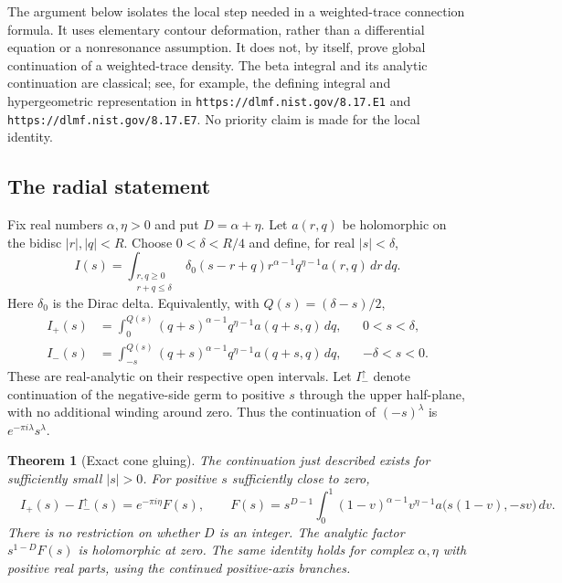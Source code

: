 \documentclass[11pt,a4paper]{article}
\newtheorem{theorem}{Theorem}[section]
\theoremstyle{definition}
\theoremstyle{remark}
\numberwithin{equation}{section}
\begin{document}
The argument below isolates the local step needed in a weighted-trace
connection formula. It uses elementary contour deformation, rather than
a differential equation or a nonresonance assumption. It does not, by
itself, prove global continuation of a weighted-trace density. The beta
integral and its analytic continuation are classical; see, for example,
the defining integral and hypergeometric representation in
\texttt{https://dlmf.nist.gov/8.17.E1} and
\texttt{https://dlmf.nist.gov/8.17.E7}. No priority claim is made for
the local identity.

\subsection{The radial statement}

Fix real numbers $\alpha,\eta>0$ and put $D=\alpha+\eta$.
Let $a(r,q)$ be holomorphic on the bidisc $|r|,|q|<R$.
Choose $0<\delta<R/4$ and define, for real $|s|<\delta$,
\begin{equation}\label{p9:acg:density}
 I(s)=\int_{\substack{r,q\geq0\\r+q\leq\delta}}
       \delta_0(s-r+q)r^{\alpha-1}q^{\eta-1}a(r,q)\,dr\,dq.
\end{equation}
Here $\delta_0$ is the Dirac delta. Equivalently, with
$Q(s)=(\delta-s)/2$,
\begin{align}
 I_+(s)&=\int_0^{Q(s)}(q+s)^{\alpha-1}q^{\eta-1}a(q+s,q)\,dq,
                    &&0<s<\delta,\label{p9:acg:right}\\
 I_-(s)&=\int_{-s}^{Q(s)}(q+s)^{\alpha-1}q^{\eta-1}a(q+s,q)\,dq,
                    &&-\delta<s<0.\label{p9:acg:left}
\end{align}
These are real-analytic on their respective open intervals. Let
$I_-^\uparrow$ denote continuation of the negative-side germ to positive
$s$ through the upper half-plane, with no additional winding around zero.
Thus the continuation of $(-s)^\lambda$ is
$e^{-\pi i\lambda}s^\lambda$.

\begin{theorem}[Exact cone gluing]\label{p9:acg:exact}
The continuation just described exists for sufficiently small $|s|>0$.
For positive $s$ sufficiently close to zero,
\begin{equation}\label{p9:acg:jump}
 \boxed{\quad I_+(s)-I_-^\uparrow(s)
       =e^{-\pi i\eta}F(s),\qquad
 F(s)=s^{D-1}\int_0^1
       (1-v)^{\alpha-1}v^{\eta-1}
       a\bigl(s(1-v),-sv\bigr)\,dv.\quad}
\end{equation}
There is no restriction on whether $D$ is an integer. The analytic
factor $s^{1-D}F(s)$ is holomorphic at zero. The same identity holds
for complex $\alpha,\eta$ with positive real parts, using the continued
positive-axis branches.
\end{theorem}
\end{document}
